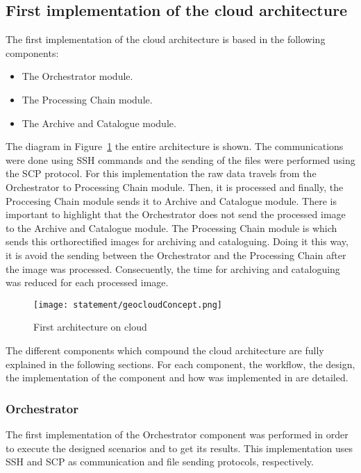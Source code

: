 \subsection{First implementation of the cloud architecture}

The first implementation of the cloud architecture is based in the following
components:
\begin{itemize}
\item The Orchestrator module.
\item The Processing Chain module.
\item The Archive and Catalogue module.
\end{itemize}

The diagram in Figure~\ref{fig:first-architecture} the entire architecture is shown. The
communications were done using \ac{SSH} commands and the sending of the files were
performed using the \ac{SCP} protocol. For this implementation the raw data
travels from the Orchestrator to Processing Chain module. Then, it is
processed and finally, the Proccesing Chain module sends it to Archive and
Catalogue module. There is important to highlight that the
Orchestrator does not send the processed image to the Archive and Catalogue
module. The Processing Chain module is which sends this orthorectified images
for archiving and cataloguing. Doing it this way, it is avoid the sending between the Orchestrator
and the Processing Chain after the image was processed. Consecuently, the time for
archiving and cataloguing was reduced for each processed image.

\begin{figure}[!h]
\begin{center}
\texttt{[image: statement/geocloudConcept.png]}
\caption{First architecture on cloud}
\label{fig:first-architecture}
\end{center}
\end{figure}

The different components which compound the cloud architecture are fully
explained in the following sections. For each component, the  workflow, the
design, the implementation of the component and how was implemented in \bonfire are detailed.

\subsubsection{Orchestrator}

The first implementation of the Orchestrator component was performed in order to
execute the designed scenarios and to get its results. This implementation uses
\ac{SSH} and \ac{SCP} as communication and file sending protocols, respectively. 

